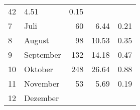 \begin{longtable}{lXrrr}
       \num{42} &
       \num[round-mode=places,round-precision=2]{4,51} &
         \num[round-mode=places,round-precision=2]{0,15} \\

     7 &
     \multicolumn{1}{X}{ Juli   } &


       \num{60} &
       \num[round-mode=places,round-precision=2]{6,44} &
         \num[round-mode=places,round-precision=2]{0,21} \\

     8 &
     \multicolumn{1}{X}{ August   } &


       \num{98} &
       \num[round-mode=places,round-precision=2]{10,53} &
         \num[round-mode=places,round-precision=2]{0,35} \\

     9 &
     \multicolumn{1}{X}{ September   } &


       \num{132} &
       \num[round-mode=places,round-precision=2]{14,18} &
         \num[round-mode=places,round-precision=2]{0,47} \\

     10 &
     \multicolumn{1}{X}{ Oktober   } &


       \num{248} &
       \num[round-mode=places,round-precision=2]{26,64} &
         \num[round-mode=places,round-precision=2]{0,88} \\

     11 &
     \multicolumn{1}{X}{ November   } &


       \num{53} &
       \num[round-mode=places,round-precision=2]{5,69} &
         \num[round-mode=places,round-precision=2]{0,19} \\

     12 &
     \multicolumn{1}{X}{ Dezember   } &



\end{longtable}
